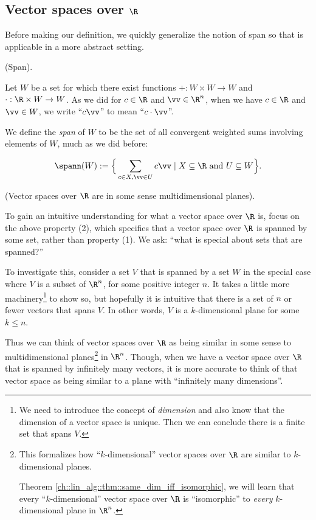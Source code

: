\subsection*{Vector spaces over $\R$}

Before making our definition, we quickly generalize the notion of span so that is applicable in a more abstract setting.

\begin{defn}
    (Span).
    
    Let $W$ be a set for which there exist functions $+:W \times W \rightarrow W$ and $\cdot:\R \times W \rightarrow W$. As we did for $c \in \R$ and $\vv \in \R^n$, when we have $c \in \R$ and $\vv \in W$,  we write ``$c \vv$'' to mean ``$c \cdot \vv$''.
    
    We define the \textit{span} of $W$ to be the set of all convergent weighted sums involving elements of $W$, much as we did before:
    
    \begin{align*}
        \spann(W) := \Big\{ \sum_{c \in X, \vv \in U} c \vv \mid X \subseteq \R \text{ and } U \subseteq W \Big\}.
    \end{align*}
\end{defn}


\begin{remark}
    (Vector spaces over $\R$ are in some sense multidimensional planes).
    
    To gain an intuitive understanding for what a vector space over $\R$ is, focus on the above property (2), which specifies that a vector space over $\R$ is spanned by some set, rather than property (1). We ask: ``what is special about sets that are spanned?''
    
    To investigate this, consider  a set $V$ that is spanned by a set $W$ in the special case where $V$ is a subset of $\R^n$, for some positive integer $n$. It takes a little more machinery\footnote{We need to introduce the concept of \textit{dimension} and also know that the dimension of a vector space is unique. Then we can conclude there is a finite set that spans $V$.} to show so, but hopefully it is intuitive that there is a set of $n$ or fewer vectors that spans $V$. In other words, $V$ is a $k$-dimensional plane for some $k \leq n$.
    
    Thus we can think of vector spaces over $\R$ as being similar in some sense to multidimensional planes\footnote{This formalizes how ``$k$-dimensional'' vector spaces over $\R$ are similar to $k$-dimensional planes.
    
    Theorem \ref{ch::lin_alg::thm::same_dim_iff_isomorphic}, we will learn that every ``$k$-dimensional'' vector space over $\R$ is ``isomorphic'' to \textit{every} $k$-dimensional plane in $\R^n$.} in $\R^n$. Though, when we have a vector space over $\R$ that is spanned by infinitely many vectors, it is more accurate to think of that vector space as being similar to a plane with ``infinitely many dimensions''. 
\end{remark}
